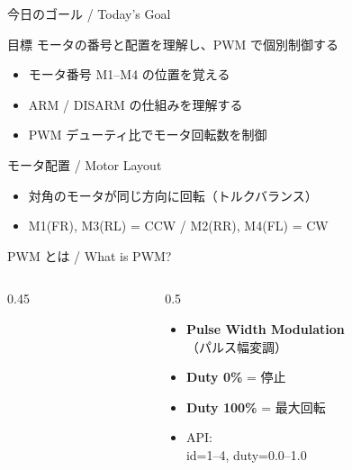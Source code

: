 \documentclass[aspectratio=169, 14pt]{beamer}
\begin{document}

\begin{frame}{今日のゴール / Today's Goal}
  \begin{block}{目標}
    モータの番号と配置を理解し、PWM で個別制御する
  \end{block}

  \vspace{1em}

  \begin{itemize}
    \item モータ番号 M1--M4 の位置を覚える
    \item ARM / DISARM の仕組みを理解する
    \item PWM デューティ比でモータ回転数を制御
  \end{itemize}
\end{frame}

\begin{frame}{モータ配置 / Motor Layout}
  \begin{center}
    \resizebox{0.38\textwidth}{!}{}
  \end{center}
  \begin{itemize}
    \item 対角のモータが同じ方向に回転（トルクバランス）
    \item M1(FR), M3(RL) = CCW / M2(RR), M4(FL) = CW
  \end{itemize}
\end{frame}

\begin{frame}{PWM とは / What is PWM?}
  \begin{columns}[T]
    \begin{column}{0.45\textwidth}
      \begin{center}
        \resizebox{!}{0.72\textheight}{}
      \end{center}
    \end{column}
    \begin{column}{0.5\textwidth}
      \vspace{1em}
      \begin{itemize}
        \item \textbf{Pulse Width Modulation}\\（パルス幅変調）
        \item \textbf{Duty 0\%} = 停止
        \item \textbf{Duty 100\%} = 最大回転
        \item API: \\
              \small id=1--4, duty=0.0--1.0
      \end{itemize}
    \end{column}
  \end{columns}
\end{frame}
\end{document}
